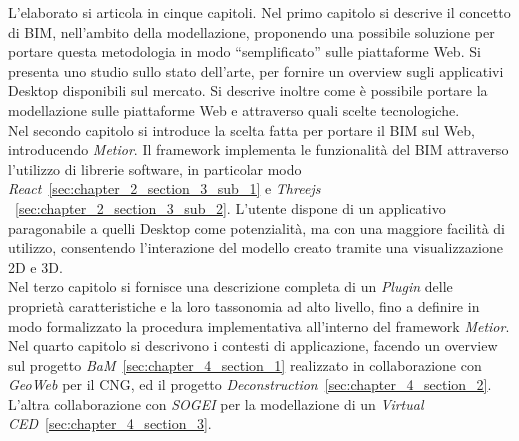 L'elaborato si articola in cinque capitoli.
Nel primo capitolo si descrive il concetto di BIM, nell’ambito della modellazione, proponendo una possibile soluzione
per portare questa metodologia in modo ``semplificato'' sulle piattaforme Web.
Si presenta uno studio sullo stato dell’arte, per fornire un overview
sugli applicativi Desktop disponibili sul mercato. Si descrive inoltre come è
possibile portare la modellazione sulle piattaforme Web e attraverso quali scelte tecnologiche.\\
Nel secondo capitolo si introduce la scelta fatta per portare il BIM sul Web, introducendo \emph{Metior}.
Il framework implementa le funzionalità del BIM attraverso l'utilizzo di librerie software,
in particolar modo \emph{React}~\ref{sec:chapter_2_section_3_sub_1} e \emph{Threejs} ~\ref{sec:chapter_2_section_3_sub_2}.
L'utente dispone di un applicativo paragonabile a quelli
Desktop come potenzialità, ma con una maggiore facilità di utilizzo, consentendo l'interazione del modello creato
tramite una visualizzazione 2D e 3D.\\
Nel terzo capitolo si fornisce una descrizione completa di un \emph{Plugin} delle
proprietà caratteristiche e la loro tassonomia ad alto livello, fino a definire in modo formalizzato
la procedura implementativa all'interno del framework \emph{Metior}.\\
Nel quarto capitolo si descrivono i contesti di applicazione, facendo un overview sul
progetto \emph{BaM}~\ref{sec:chapter_4_section_1} realizzato in collaborazione con \emph{GeoWeb} per il CNG,
ed il progetto \emph{Deconstruction}~\ref{sec:chapter_4_section_2}.
L'altra collaborazione con \emph{SOGEI} per la modellazione di un \emph{Virtual CED}~\ref{sec:chapter_4_section_3}.
